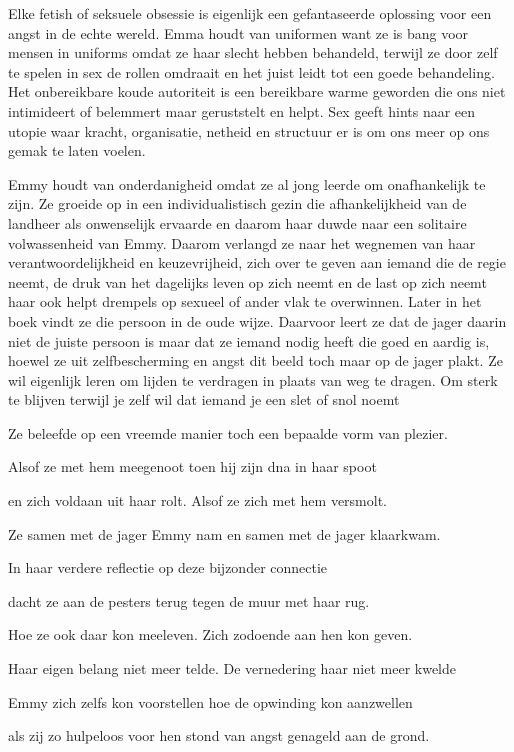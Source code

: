 Elke fetish of seksuele obsessie is eigenlijk een gefantaseerde oplossing voor een angst in de echte wereld. Emma houdt van uniformen want ze is bang voor mensen in uniforms omdat ze haar slecht hebben behandeld, terwijl ze door zelf te spelen in sex de rollen omdraait en het juist leidt tot een goede behandeling. Het onbereikbare koude autoriteit is een bereikbare warme geworden die ons niet intimideert of belemmert maar geruststelt en helpt. Sex geeft hints naar een utopie waar kracht, organisatie, netheid en structuur er is om ons meer op ons gemak te laten voelen.

Emmy houdt van onderdanigheid omdat ze al jong leerde om onafhankelijk te zijn. Ze groeide op in een individualistisch gezin die afhankelijkheid van de landheer als onwenselijk ervaarde en daarom haar duwde naar een solitaire volwassenheid van Emmy. Daarom verlangd ze naar het wegnemen van haar verantwoordelijkheid en keuzevrijheid, zich over te geven aan iemand die de regie neemt, de druk van het dagelijks leven op zich neemt en de last op zich neemt haar ook helpt drempels op sexueel of ander vlak te overwinnen. Later in het boek vindt ze die persoon in de oude wijze. Daarvoor leert ze dat de jager daarin niet de juiste persoon is maar dat ze iemand nodig heeft die goed en aardig is, hoewel ze uit zelfbescherming en angst dit beeld toch maar op de jager plakt. Ze wil eigenlijk leren om lijden te verdragen in plaats van weg te dragen. Om sterk te blijven terwijl je zelf wil dat iemand je een slet of snol noemt

Ze beleefde op een vreemde manier
toch een bepaalde vorm van plezier.

Alsof ze met hem meegenoot
toen hij zijn dna in haar spoot

en zich voldaan uit haar rolt.
Alsof ze zich met hem versmolt.

Ze samen met de jager Emmy nam
en samen met de jager klaarkwam.

In haar verdere reflectie
op deze bijzonder connectie

dacht ze aan de pesters terug
tegen de muur met haar rug.

Hoe ze ook daar kon meeleven.
Zich zodoende aan hen kon geven.

Haar eigen belang niet meer telde.
De vernedering haar niet meer kwelde

Emmy zich zelfs kon voorstellen
hoe de opwinding kon aanzwellen

als zij zo hulpeloos voor hen stond
van angst genageld aan de grond.

